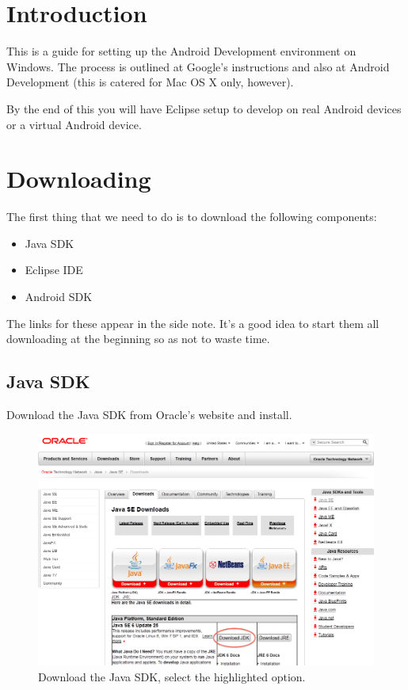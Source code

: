 \section{Introduction}

This is a guide for setting up the Android Development environment on Windows. The process is outlined at Google's instructions and also at Android Development (this is 
catered for Mac OS X only, however).

By the end of this you will have Eclipse setup to develop on real Android devices or a virtual Android device.

\section{Downloading}

The first thing that we need to do is to download the following components:
\begin{itemize}
	\item Java SDK
	\item Eclipse IDE
	\item Android SDK
\end{itemize}

The links for these appear in the side note. It's a good idea to start them all downloading at the beginning so as not to waste time.

\subsection{Java SDK}

Download the Java SDK from Oracle's website and install.

\begin{figure}[!ht]
  \includegraphics[width=\textwidth]{./images/java_sdk.png}%
  \caption{Download the Java SDK, select the highlighted option.}%
  \label{fig:javasdk}%
\end{figure}

